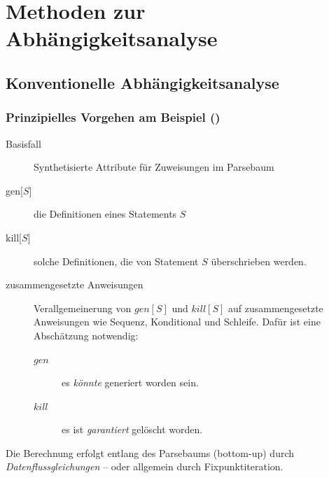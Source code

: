 
\section{Methoden zur Abhängigkeitsanalyse}
\subsection{Konventionelle Abhängigkeitsanalyse} %
\label{sec:konventionelle_abhaengigkeitsanalyse}

\subsubsection{Prinzipielles Vorgehen am Beispiel ()}
\label{ssub:prinzipielles_vorgehen_am_beispiel}

\begin{description}
\item[Basisfall] Synthetisierte Attribute für Zuweisungen im Parsebaum
\item[gen$\lbrack S \rbrack$] die Definitionen eines Statements $S$
\item[kill$\lbrack S \rbrack$] solche Definitionen, die von Statement $S$ überschrieben werden.
\item[zusammengesetzte Anweisungen] Verallgemeinerung von $gen[S]$ und $kill[S]$ auf zusammengesetzte Anweisungen wie Sequenz, Konditional und Schleife.
  Dafür ist eine Abschätzung notwendig:
  \begin{description}
    \item[$gen$] es \emph{könnte} generiert worden sein.
    \item[$kill$] es ist \emph{garantiert} gelöscht worden.
  \end{description}
\end{description}

Die Berechnung erfolgt entlang des Parsebaums (bottom-up) durch \emph{Datenflussgleichungen} -- oder allgemein durch Fixpunktiteration.

